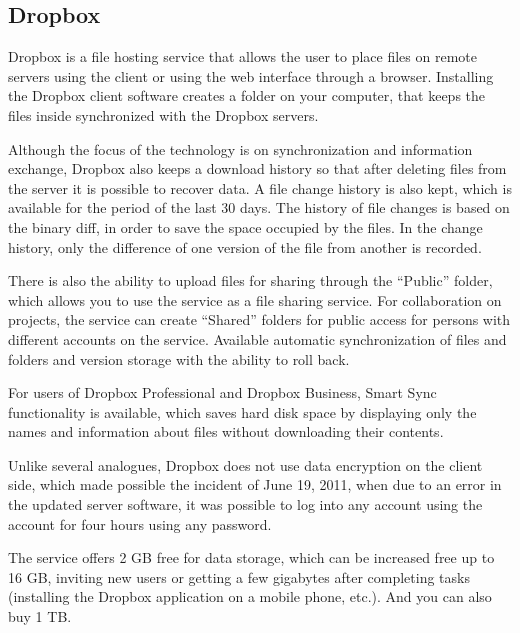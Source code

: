 \subsection{Dropbox}
Dropbox is a file hosting service that allows the user to place files on remote servers using the client or using the web interface through a browser.
Installing the Dropbox client software creates a folder on your computer, that keeps the files inside synchronized with the Dropbox servers.

Although the focus of the technology is on synchronization and information exchange, Dropbox also keeps a download history so that after deleting files from the server it is possible to recover data.
A file change history is also kept, which is available for the period of the last 30 days.
The history of file changes is based on the binary diff, in order to save the space occupied by the files.
In the change history, only the difference of one version of the file from another is recorded.\cite{DropboxDiff}

There is also the ability to upload files for sharing through the “Public” folder, which allows you to use the service as a file sharing service.
For collaboration on projects, the service can create “Shared” folders for public access for persons with different accounts on the service.
Available automatic synchronization of files and folders and version storage with the ability to roll back.\cite{DropboxContents}

For users of Dropbox Professional and Dropbox Business, Smart Sync functionality is available, which saves hard disk space by displaying only the names and information about files without downloading their contents.\cite{DropboxSmartSync}

Unlike several analogues, Dropbox does not use data encryption on the client side, which made possible the incident of June 19, 2011, when due to an error in the updated server software, it was possible to log into any account using the account for four hours using any password.
\cite{DropboxProblem}
 
The service offers 2 GB free for data storage, which can be increased free up to 16 GB, inviting new users or getting a few gigabytes after completing tasks (installing the Dropbox application on a mobile phone, etc.). And you can also buy 1 TB.\cite{DropboxContents}